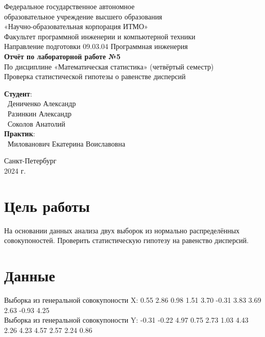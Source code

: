\documentclass{article}
\begin{document}
\begin{center}
    \Large
    Федеральное государственное автономное \\
    образовательное учреждение высшего образования \\ 
    «Научно-образовательная корпорация ИТМО»\\
    \vspace{0.5cm}
    \large
    Факультет программной инженерии и компьютерной техники \\
    Направление подготовки 09.03.04 Программная инженерия \\
    \vspace{1cm}
    \Large
    \textbf{Отчёт по лабораторной работе №5} \\
    По дисциплине «Математическая статистика» (четвёртый семестр)\\
    Проверка статистической гипотезы о равенстве дисперсий\\
    \large
    \vspace{8cm}

    \begin{minipage}{.33\textwidth}
    \end{minipage}
    \hfill
    \begin{minipage}{.4\textwidth}
    
        \textbf{Студент}: \vspace{.1cm} \\
        \ Дениченко Александр\\
        \ Разинкин Александр\\
        \ Соколов Анатолий\\
        \textbf{Практик}:  \\
        \ Милованович Екатерина Воиславовна
    \end{minipage}
    \vfill
Санкт-Петербург\\ 2024 г.
\end{center}
\thispagestyle{empty}

\newpage
\section*{Цель работы}
На основании данных анализа двух выборок из нормально распределённых совокупоностей. Проверить статистическую гипотезу на равенство дисперсий.
\section*{Данные }
Выборка из генеральной совокупоности X: 0.55 2.86 0.98 1.51 3.70 -0.31 3.83 3.69 2.63 -0.93 4.25\\
Выборка из генеральной совокупоности Y: -0.31 -0.22 4.97 0.75 2.73 1.03 4.43 2.26 4.23 4.57 2.57 2.24 0.86
\end{document}
